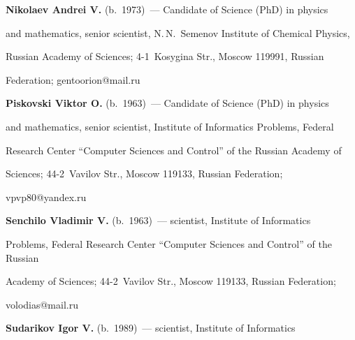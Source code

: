 \vspace*{3pt}





\noindent


\textbf{Nikolaev Andrei V.} (b.\ 1973)~--- Candidate of Science (PhD) in physics 


and mathematics, senior scientist, N.\,N.~Semenov Institute of Chemical Physics,  


Russian Academy of Sciences; 4-1~Kosygina Str., Moscow 119991, Russian 


Federation; \mbox{gentoorion@mail.ru} 





\vspace*{3pt}





\noindent


\textbf{Piskovski Viktor O.} (b.\ 1963)~--- Candidate of Science (PhD) in physics 


and mathematics, senior scientist, Institute of Informatics Problems, Federal 


Research Center ``Computer Sciences and Control'' of the Russian Academy of 


Sciences; 44-2~Vavilov Str., Moscow 119133, Russian Federation; 


\mbox{vpvp80@yandex.ru}





\vspace*{3pt}





\noindent


\textbf{Senchilo Vladimir V.} (b.\ 1963)~--- scientist, Institute of Informatics 


Problems, Federal Research Center ``Computer Sciences and Control'' of the Russian 


Academy of Sciences; 44-2~Vavilov Str., Moscow 119133, Russian Federation; 


\mbox{volodias@mail.ru} 





\vspace*{3pt}





\noindent


\textbf{Sudarikov Igor V.} (b.\ 1989)~--- scientist, Institute of Informatics 


